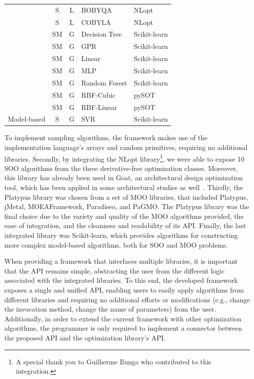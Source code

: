 \begin{table}[]
\begin{tabular}{cccll}
		& S & L & BOBYQA & NLopt \\
		& S & L & COBYLA & NLopt \\
		& SM & G & Decision Tree & Scikit-learn \\
		& SM & G & GPR & Scikit-learn \\
		& SM & G & Linear & Scikit-learn \\
		& SM & G & MLP & Scikit-learn \\
		& SM & G & Random Forest & Scikit-learn \\
		& SM & G & RBF-Cubic & pySOT \\
		& SM & G & RBF-Linear & pySOT \\
		\multirow{-10}{*}{Model-based} & S & G & SVR & Scikit-learn
	\end{tabular}
\end{table}

To implement sampling algorithms, the framework makes use of the implementation language's arrays and random primitives, requiring no additional libraries. Secondly, by integrating the NLopt library\footnote{A special thank you to Guilherme Ilunga who contributed to this integration.}, we were able to expose 10 \ac{SOO} algorithms from the three derivative-free optimization classes. Moreover, this library has already been used in Goat, an architectural design optimization tool, which has been applied in some architectural studies as well~\cite{Wortmann2017ADO}. Thirdly, the Platypus library was chosen from a set of \ac{MOO} libraries, that included Platypus, jMetal, MOEAFramework, Paradiseo, and PaGMO. The Platypus library was the final choice due to the variety and quality of the \ac{MOO} algorithms provided, the ease of integration, and the cleanness and readability of its \ac{API}. Finally, the last integrated library was Scikit-learn, which provides algorithms for constructing more complex model-based algorithms, both for \ac{SOO} and \ac{MOO} problems.

When providing a framework that interfaces multiple libraries, it is important that the \ac{API} remains simple, abstracting the user from the different logic associated with the integrated libraries. To this end, the developed framework exposes a single and unified \ac{API}, enabling users to easily apply algorithms from different libraries and requiring no additional efforts or modifications (e.g., change the invocation method, change the name of parameters) from the user. Additionally, in order to extend the current framework with other optimization algorithms, the programmer is only required to implement a connector between the proposed \ac{API} and the optimization library's \ac{API}.

